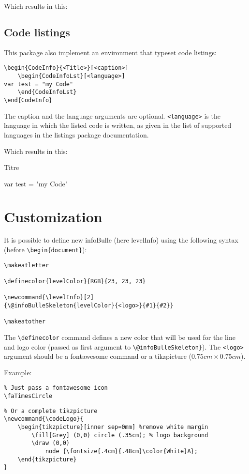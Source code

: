 \documentclass[a4paper, 11pt, oneside, fleqn]{article}
\begin{document}
Which results in this:

\subsection{Code listings}
This package also implement an environment that typeset code listings:
\begin{lstlisting}
\begin{CodeInfo}{<Title>}[<caption>]
	\begin{CodeInfoLst}[<language>]
var test = "my Code"
	\end{CodeInfoLst}
\end{CodeInfo}
\end{lstlisting}

The caption and the language arguments are optional. \verb|<language>| is the language in which the listed code is written, as given in the list of supported languages in the listings package documentation.

Which results in this:


\begin{CodeInfo}{Titre}
	\begin{CodeInfoLst}
var test = "my Code"
	\end{CodeInfoLst}
\end{CodeInfo}

\section{Customization}
It is possible to define new infoBulle (here levelInfo) using the following syntax (before \verb|\begin{document}|):

\begin{lstlisting}
\makeatletter

\definecolor{levelColor}{RGB}{23, 23, 23}

\newcommand{\levelInfo}[2]
{\@infoBulleSkeleton{levelColor}{<logo>}{#1}{#2}}

\makeatother
\end{lstlisting}

The \verb|\definecolor| command defines a new color that will be used for the line and logo color (passed as first argument to \verb|\@infoBulleSkeleton}|). The \verb|<logo>| argument should be a fontawesome command or a tikzpicture ($0.75cm \times 0.75cm$).

Example:
\begin{lstlisting}
% Just pass a fontawesome icon
\faTimesCircle
\end{lstlisting}

\begin{lstlisting}
% Or a complete tikzpicture
\newcommand{\codeLogo}{
	\begin{tikzpicture}[inner sep=0mm] %remove white margin
		\fill[Grey] (0,0) circle (.35cm); % logo background
		\draw (0,0)
			node {\fontsize{.4cm}{.48cm}\color{White}A};
	\end{tikzpicture}
}
\end{lstlisting}
\end{document}
